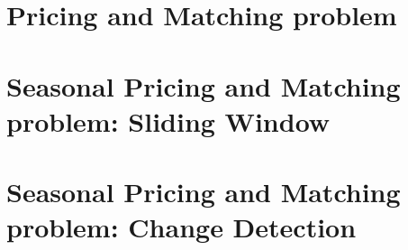     \section*{Pricing and Matching problem}
    \label{sect:Pricing and Matching problem}
		
    \section*{Seasonal Pricing and Matching problem: Sliding Window}
    \label{sect:Seasonal Pricing and Matching problem: Sliding Window}
		
    \section*{Seasonal Pricing and Matching problem: Change Detection}
    \label{sect:Seasonal Pricing and Matching problem: Change Detection}
	
    \label{sect:References}
    \printbibliography[title={References}]
